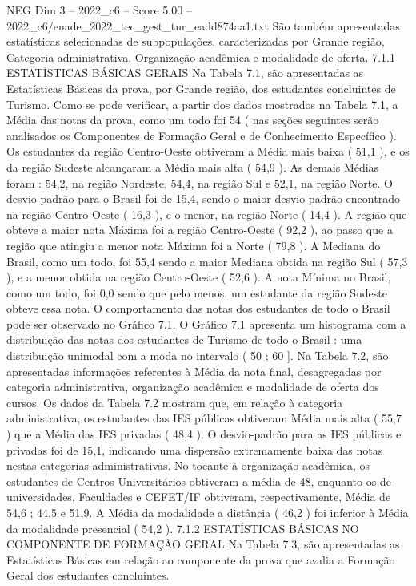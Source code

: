 \begin{textsample}{NEG Dim 3 – 2022\_c6 – Score 5.00 – 2022\_c6/enade\_2022\_tec\_gest\_tur\_eadd874aa1.txt}
São também apresentadas estatísticas selecionadas de subpopulações, caracterizadas por Grande região, Categoria administrativa, Organização acadêmica e modalidade de oferta. 7.1.1 ESTATÍSTICAS BÁSICAS GERAIS Na Tabela 7.1, são apresentadas as Estatísticas Básicas da prova, por Grande região, dos estudantes concluintes de Turismo.
Como se pode verificar, a partir dos dados mostrados na Tabela 7.1, a Média das notas da prova, como um todo foi 54 ( nas seções seguintes serão analisados os Componentes de Formação Geral e de Conhecimento Específico ).
Os estudantes da região Centro-Oeste obtiveram a Média mais baixa ( 51,1 ), e os da região Sudeste alcançaram a Média mais alta ( 54,9 ).
As demais Médias foram : 54,2, na região Nordeste, 54,4, na região Sul e 52,1, na região Norte.
O desvio-padrão para o Brasil foi de 15,4, sendo o maior desvio-padrão encontrado na região Centro-Oeste ( 16,3 ), e o menor, na região Norte ( 14,4 ).
A região que obteve a maior nota Máxima foi a região Centro-Oeste ( 92,2 ), ao passo que a região que atingiu a menor nota Máxima foi a Norte ( 79,8 ).
A Mediana do Brasil, como um todo, foi 55,4 sendo a maior Mediana obtida na região Sul ( 57,3 ), e a menor obtida na região Centro-Oeste ( 52,6 ).
A nota Mínima no Brasil, como um todo, foi 0,0 sendo que pelo menos, um estudante da região Sudeste obteve essa nota.
O comportamento das notas dos estudantes de todo o Brasil pode ser observado no Gráfico 7.1.
O Gráfico 7.1 apresenta um histograma com a distribuição das notas dos estudantes de Turismo de todo o Brasil : uma distribuição unimodal com a moda no intervalo ( 50 ; 60 ].
Na Tabela 7.2, são apresentadas informações referentes à Média da nota final, desagregadas por categoria administrativa, organização acadêmica e modalidade de oferta dos cursos.
Os dados da Tabela 7.2 mostram que, em relação à categoria administrativa, os estudantes das IES públicas obtiveram Média mais alta ( 55,7 ) que a Média das IES privadas ( 48,4 ).
O desvio-padrão para as IES públicas e privadas foi de 15,1, indicando uma dispersão extremamente baixa das notas nestas categorias administrativas.
No tocante à organização acadêmica, os estudantes de Centros Universitários obtiveram a média de 48, enquanto os de universidades, Faculdades e CEFET/IF obtiveram, respectivamente, Média de 54,6 ; 44,5 e 51,9.
A Média da modalidade a distância ( 46,2 ) foi inferior à Média da modalidade presencial ( 54,2 ). 7.1.2 ESTATÍSTICAS BÁSICAS NO COMPONENTE DE FORMAÇÃO GERAL Na Tabela 7.3, são apresentadas as Estatísticas Básicas em relação ao componente da prova que avalia a Formação Geral dos estudantes concluintes.

\end{textsample}
